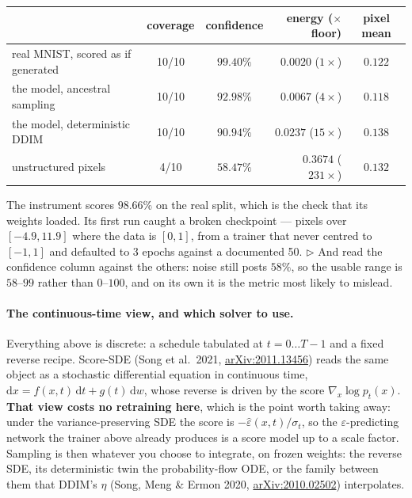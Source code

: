 \begin{center}
\begin{tabular}{@{}l c c r c@{}}
\hline
& coverage & confidence & energy ($\times$ floor) & pixel mean \\
\hline
real MNIST, scored as if generated & 10/10 & $99.40\%$ & $0.0020$ \;($1\times$)  & $0.122$ \\
the model, ancestral sampling      & 10/10 & $92.98\%$ & $0.0067$ \;($4\times$)  & $0.118$ \\
the model, deterministic DDIM      & 10/10 & $90.94\%$ & $0.0237$ \;($15\times$) & $0.138$ \\
unstructured pixels                &  4/10 & $58.47\%$ & $0.3674$ \;($231\times$)& $0.132$ \\
\hline
\end{tabular}
\end{center}

\noindent The instrument scores $98.66\%$ on the real split, which is the check
that its weights loaded. Its first run caught a broken checkpoint --- pixels
over $[-4.9, 11.9]$ where the data is $[0,1]$, from a trainer that never centred
to $[-1,1]$ and defaulted to 3 epochs against a documented 50.
$\triangleright$ And read the confidence column against the others: noise still
posts $58\%$, so the usable range is $58$--$99$ rather than $0$--$100$, and on
its own it is the metric most likely to mislead.

\paragraph{The continuous-time view, and which solver to use.} Everything above
is discrete: a schedule tabulated at $t = 0 \dots T{-}1$ and a fixed reverse
recipe. Score-SDE (Song et al.\ 2021,
\href{https://arxiv.org/abs/2011.13456}{arXiv:2011.13456}) reads the same object as a stochastic
differential equation in continuous time, $\mathrm{d}x = f(x,t)\,\mathrm{d}t +
g(t)\,\mathrm{d}w$, whose reverse is driven by the score
$\nabla_x \log p_t(x)$. \textbf{That view costs no retraining here}, which is
the point worth taking away: under the variance-preserving SDE the score is
$-\hat\varepsilon(x,t)/\sigma_t$, so the $\varepsilon$-predicting network the
trainer above already produces is a score model up to a scale factor.
Sampling is then whatever you choose to integrate, on frozen weights: the
reverse SDE, its deterministic twin the probability-flow ODE, or the family
between them that DDIM's $\eta$ (Song, Meng \& Ermon 2020,
\href{https://arxiv.org/abs/2010.02502}{arXiv:2010.02502}) interpolates.

